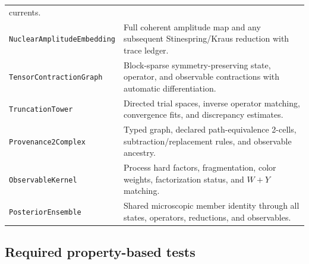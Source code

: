 \documentclass[11pt]{article}
\begin{document}
\begin{longtable}{L{0.27\textwidth}L{0.65\textwidth}}
currents.\\
\texttt{NuclearAmplitude\allowbreak Embedding} & Full coherent amplitude map and any
subsequent Stinespring/Kraus reduction with trace ledger.\\
\texttt{TensorContractionGraph} & Block-sparse symmetry-preserving state,
operator, and observable contractions with automatic differentiation.\\
\texttt{TruncationTower} & Directed trial spaces, inverse operator matching,
convergence fits, and discrepancy estimates.\\
\texttt{Provenance2Complex} & Typed graph, declared path-equivalence
2-cells, subtraction/replacement rules, and observable ancestry.\\
\texttt{ObservableKernel} & Process hard factors, fragmentation, color
weights, factorization status, and \(W+Y\) matching.\\
\texttt{PosteriorEnsemble} & Shared microscopic member identity through all
states, operators, reductions, and observables.\\
\bottomrule
\end{longtable}

\subsection{Required property-based tests}
\end{document}
